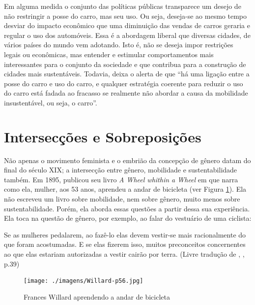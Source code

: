 Em alguma medida o conjunto das políticas públicas transparece um desejo de não restringir a posse do carro, mas seu uso. Ou seja, deseja-se ao mesmo tempo desviar do impacto econômico que uma diminuição das vendas de carros geraria e regular o uso dos automóveis. Essa é a abordagem liberal que diversas cidades, de vários países do mundo vem adotando. Isto é, não se deseja impor restrições legais ou econômicas, mas entender e estimular comportamentos mais interessantes para o conjunto da sociedade e que contribua para a construção de cidades mais sustentáveis. Todavia,  deixa o alerta de que ``há uma ligação entre a posse do carro e uso do carro, e qualquer estratégia coerente para reduzir o uso do carro está fadada ao fracasso se realmente não abordar a causa da mobilidade insustentável, ou seja, o carro''.



\clearpage
\section{Intersecções e Sobreposições}

Não apenas o movimento feminista e o embrião da concepção de gênero datam do final do século XIX; a intersecção entre gênero, mobilidade e sustentabilidade também. Em 1895,  publicou seu livro \emph{A Wheel whithin a Wheel} em que narra como ela, mulher, aos 53 anos, aprendeu a andar de bicicleta (ver Figura \ref{fig:willard}). Ela não escreveu um livro sobre mobilidade, nem sobre gênero, muito menos sobre sustentabilidade. Porém, ela aborda essas questões a partir dessa sua experiência. Ela toca na questão de gênero, por exemplo, ao falar do vestuário de uma ciclista:

\begin{citacao}
Se as mulheres pedalarem, ao fazê-lo elas devem vestir-se mais racionalmente do que foram acostumadas. E se elas fizerem isso, muitos preconceitos concernentes ao que elas estariam autorizadas a vestir cairão por terra. (Livre tradução de , \citeyear{WILLARD1895}, p.39)
\end{citacao}

\begin{figure}[htb]%
    \caption{\label{fig:willard}Frances Willard aprendendo a andar de bicicleta}%
    \begin{center}%
        \texttt{[image: ./imagens/Willard-p56.jpg]}%
    \end{center}%
\end{figure}%

